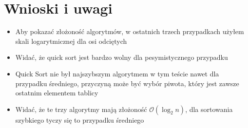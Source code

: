 \documentclass[10pt,a4paper]{article}
\begin{document}
\section{Wnioski i uwagi}

\begin{itemize}
	\item Aby pokazać złożoność algorytmów, w ostatnich trzech przypadkach użyłem
		skali logarytmicznej dla osi odciętych
	\item Widać, że quick sort jest bardzo wolny dla pesymistycznego przypadku
	\item Quick Sort nie był najszybszym algorytmem w tym teście nawet dla przypadku średniego,
	 przyczyną może być wybór piwota, który jest zawsze ostatnim elementem tablicy
	 \item Widać, że te trzy algorytmy mają złożoność $\mathcal{O}(\log_2 n)$, dla
	 sortowania szybkiego tyczy się to przypadku średniego
	
\end{itemize}
\end{document}

